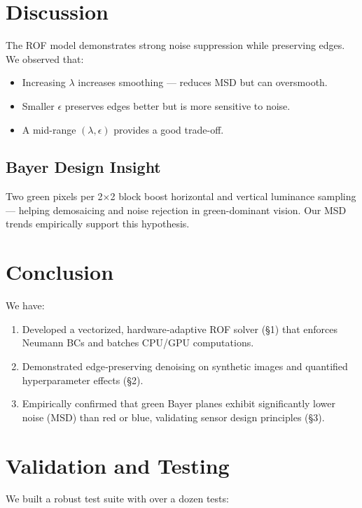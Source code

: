 \documentclass[11pt]{article}
\begin{document}
\section*{Discussion}
The ROF model demonstrates strong noise suppression while preserving edges. We observed that:
\begin{itemize}
  \item Increasing \(\lambda\) increases smoothing — reduces MSD but can oversmooth.
  \item Smaller \(\epsilon\) preserves edges better but is more sensitive to noise.
  \item A mid-range \((\lambda, \epsilon)\) provides a good trade-off.
\end{itemize}

\subsection*{Bayer Design Insight}
Two green pixels per 2×2 block boost horizontal and vertical luminance sampling — helping demosaicing and noise rejection in green-dominant vision. Our MSD trends empirically support this hypothesis.



\section*{Conclusion}
We have:
\begin{enumerate}
  \item Developed a vectorized, hardware‐adaptive ROF solver (\S1) that enforces Neumann BCs and batches CPU/GPU computations.
  \item Demonstrated edge‐preserving denoising on synthetic images and quantified hyperparameter effects (\S2).
  \item Empirically confirmed that green Bayer planes exhibit significantly lower noise (MSD) than red or blue, validating sensor design principles (\S3).
\end{enumerate}



\section*{Validation and Testing}
We built a robust test suite with over a dozen tests:
\end{document}
